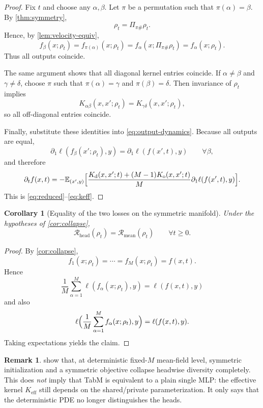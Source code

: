 \documentclass[11pt]{article}
\newtheorem{corollary}[theorem]{Corollary}
\theoremstyle{definition}
\newtheorem{remark}[theorem]{Remark}
\newcommand{\E}{\mathbb{E}}
\newcommand{\riskhead}{\mathcal{R}_{\mathrm{head}}}
\newcommand{\riskmean}{\mathcal{R}_{\mathrm{mean}}}
\begin{document}
\begin{proof}
Fix $t$ and choose any $\alpha,\beta$.
Let $\pi$ be a permutation such that $\pi(\alpha)=\beta$.
By \cref{thm:symmetry},
\[
  \rho_t = \Pi_{\pi\#}\rho_t.
\]
Hence, by \cref{lem:velocity-equiv},
\[
  f_\beta(x;\rho_t)
  =
  f_{\pi(\alpha)}(x;\rho_t)
  =
  f_\alpha(x;\Pi_{\pi\#}\rho_t)
  =
  f_\alpha(x;\rho_t).
\]
Thus all outputs coincide.

The same argument shows that all diagonal kernel entries coincide.
If $\alpha\neq\beta$ and $\gamma\neq\delta$, choose $\pi$ such that $\pi(\alpha)=\gamma$ and $\pi(\beta)=\delta$.
Then invariance of $\rho_t$ implies
\[
  K_{\alpha\beta}(x,x';\rho_t)=K_{\gamma\delta}(x,x';\rho_t),
\]
so all off-diagonal entries coincide.

Finally, substitute these identities into \cref{eq:output-dynamics}.
Because all outputs are equal,
\[
  \partial_1 \ell(f_\beta(x';\rho_t),y)=\partial_1 \ell(f(x',t),y)
  \qquad \forall \beta,
\]
and therefore
\[
  \partial_t f(x,t)
  =
  -
  \E_{(x',y)}
  \Bigl[
    \frac{K_{\mathrm d}(x,x';t)+(M-1)K_{\mathrm o}(x,x';t)}{M}
    \partial_1 \ell(f(x',t),y)
  \Bigr].
\]
This is \eqref{eq:reduced}--\eqref{eq:keff}.
\end{proof}

\begin{corollary}[Equality of the two losses on the symmetric manifold]
\label{cor:losses}
Under the hypotheses of \cref{cor:collapse},
\[
  \riskhead(\rho_t)=\riskmean(\rho_t)
  \qquad
  \forall t \ge 0.
\]
\end{corollary}

\begin{proof}
By \cref{cor:collapse},
\[
  f_1(x;\rho_t)=\cdots=f_M(x;\rho_t)=f(x,t).
\]
Hence
\[
  \frac1M \sum_{\alpha=1}^M \ell(f_\alpha(x;\rho_t),y)=\ell(f(x,t),y)
\]
and also
\[
  \ell\Bigl(\frac1M \sum_{\alpha=1}^M f_\alpha(x;\rho_t),y\Bigr)=\ell(f(x,t),y).
\]
Taking expectations yields the claim.
\end{proof}

\begin{remark}
 show that, at deterministic fixed-$M$ mean-field level,
symmetric initialization and a symmetric objective collapse headwise diversity completely.
This does \emph{not} imply that TabM is equivalent to a plain single MLP:
the effective kernel $K_{\mathrm{eff}}$ still depends on the shared/private parameterization.
It only says that the deterministic PDE no longer distinguishes the heads.
\end{remark}
\end{document}
